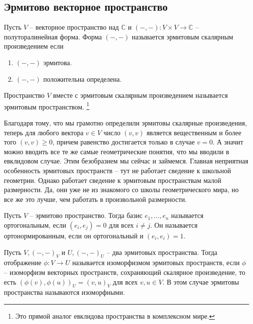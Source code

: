\subsection{Эрмитово векторное пространство}

\begin{definition}
Пусть $V$ -- векторное пространство над $\mathbb C$ и $({-},{-})\colon V\times V\to \mathbb C$ -- полуторалинейная форма.
Форма $({-},{-})$ называется эрмитовым скалярным произведением если
\begin{enumerate}
\item $({-},{-})$ эрмитова.

\item $({-},{-})$ положительна определена.
\end{enumerate}

Пространство $V$ вместе с эрмитовым скалярным произведением называется эрмитовым пространством.%
\footnote{Это прямой аналог евклидова пространства в комплексном мире.}
\end{definition}

Благодаря тому, что мы грамотно определили эрмитовы скалярные произведения, теперь для любого вектора $v\in V$ число $(v,v)$ является вещественным и более того $(v,v) \geqslant 0$, причем равенство достигается только в случае $v=0$.
А значит можно вводить все те же самые геометрические понятия, что мы вводили в евклидовом случае.
Этим безобразием мы сейчас и займемся.
Главная неприятная особенность эрмитовых пространств -- тут не работает сведение к школьной геометрии.
Однако работает сведение к эрмитовым пространствам малой размерности.
Да, они уже не из знакомого со школы геометрического мира, но все же это лучше, чем работать в произвольной размерности.

\begin{definition}
Пусть $V$ -- эрмитово пространство.
Тогда базис $e_1,\ldots,e_n$ называется ортогональным, если  $(e_i, e_j) = 0$ для всех $i\neq j$.
Он называется ортонормированным, если он ортогональный и $(e_i, e_i) = 1$.
\end{definition}

\begin{definition}
Пусть $V, ({-},{-})_V$ и $U, ({-},{-})_U$ -- два эрмитовых пространства.
Тогда отображение $\phi\colon V\to U$ называется изоморфизмом эрмитовых пространств, если $\phi$ -- изоморфизм векторных пространств, сохраняющий скалярное произведение, то есть $(\phi(v), \phi(u))_U = (v, u)_V$ для всех $v, u \in V$.
В этом случае эрмитовы пространства называются изоморфными.
\end{definition}

